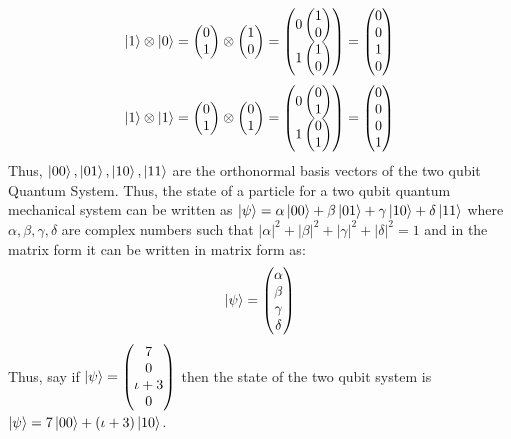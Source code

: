 \begin{example}
    \[ \ket{1} \otimes \ket{0} = \begin{pmatrix} 0 \\ 1 \end{pmatrix} \otimes \begin{pmatrix} 1 \\ 0 \end{pmatrix} = \begin{pmatrix} 0 \begin{pmatrix} 1 \\ 0 \end{pmatrix} \\ 1 \begin{pmatrix} 1 \\ 0 \end{pmatrix} \end{pmatrix} = \begin{pmatrix} 0 \\ 0 \\ 1 \\ 0 \end{pmatrix} \]
    \[ \ket{1} \otimes \ket{1} = \begin{pmatrix} 0 \\ 1 \end{pmatrix} \otimes \begin{pmatrix} 0 \\ 1 \end{pmatrix} = \begin{pmatrix} 0 \begin{pmatrix} 0 \\ 1 \end{pmatrix} \\ 1 \begin{pmatrix} 0 \\ 1 \end{pmatrix} \end{pmatrix} = \begin{pmatrix} 0 \\ 0 \\ 0 \\ 1 \end{pmatrix} \]
Thus, $\ket{00},\ket{01},\ket{10},\ket{11}$ are the orthonormal basis vectors of the two qubit Quantum System. Thus, the state of a particle for a two qubit quantum mechanical system can be written as 
$\ket{\psi}=\alpha\ket{00}+\beta\ket{01}+\gamma\ket{10}+\delta\ket{11}$ where $\alpha,\beta,\gamma,\delta$ are complex numbers such that $|\alpha|^2+|\beta|^2+|\gamma|^2+|\delta|^2=1$ and in the matrix form it can be written in matrix form as:
\[
    \ket{\psi}=\begin{pmatrix} \alpha \\ \beta \\ \gamma \\ \delta \end{pmatrix}
\]
Thus, say if $\ket{\psi}=\begin{pmatrix} 7 \\ 0 \\ \iota +3 \\ 0 \end{pmatrix}$ then the state of the two qubit system is $\ket{\psi}=7\ket{00}+(\iota+3)\ket{10}$.
\end{example}
